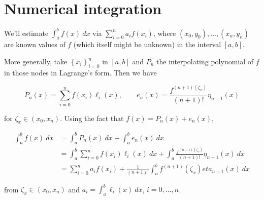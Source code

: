 \documentclass[12pt]{article}
\theoremstyle{definition}
\begin{document}
\begin{center}
\end{center}

\pagebreak 

\section{Numerical integration}

We'll estimate $\int_a^b f(x) ~ dx$ via $\sum_{i=0}^n a_i f(x_i)$, where 
$(x_0, y_0), \ldots, (x_n, y_n)$ are known values of $f$ (which itself might be
unknown) in the interval $[a, b]$. 

More generally, take $\left\{ x_i \right\}_{i=0}^n $ in $[a, b]$ and $P_n$ the
interpolating polynomial of $f$ in those nodes in Lagrange's form. Then we have 

\begin{equation*}
    P_n(x) = \sum_{i=0}^n f(x_i) \ell_i(x), \qquad e_n(x) =
    \frac{f^{(n+1)(\zeta_x)}}{(n+1)!} \eta_{n+1}(x)
\end{equation*}

for $\zeta_x \in (x_0, x_n)$. Using the fact that $f(x) = P_n(x) + e_n(x)$,

\begin{align*}
    \int_a^b f(x) ~ dx 
    &= \int_a^b P_n(x) ~ dx + \int_a^b e_n(x) ~ dx \\ 
    &= \int_a^b \sum_{i=0}^n f(x_i) \ell_i(x) ~ dx + \int_a^b
    \frac{f^{(n+1)(\zeta_x)}}{(n+1)!} \eta_{n+1}(x) ~ dx \\ 
    &= \sum_{i=0}^n a_i f(x_i) + \frac{1}{(n+1)!}\int_a^b f^{(n+1)}(\zeta_x)
    eta_{n+1}(x) ~ dx
\end{align*}

from $\zeta_x \in (x_0, x_n)$ and $a_i = \int_a^b \ell_i(x) ~ dx$, $i = 0,
\ldots, n$.
\end{document}
